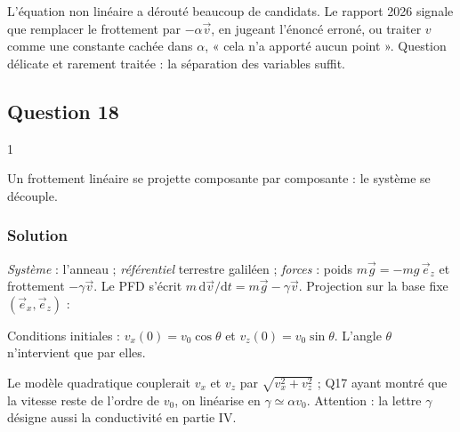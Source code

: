 \documentclass[11pt,a4paper]{article}
\newcommand{\equationajustee}[1]{%
  \sbox{\boiteequation}{$\displaystyle #1$}%
  \ifdim\wd\boiteequation>\linewidth
    \[\resizebox{\linewidth}{!}{\usebox{\boiteequation}}\]%
  \else
    \[#1\]%
  \fi}
\begin{document}
\begin{jury}

L'équation non linéaire a dérouté beaucoup de candidats. Le rapport 2026 signale que remplacer le frottement par \(-\alpha\vec v\), en jugeant l'énoncé erroné, ou traiter \(v\) comme une constante cachée dans \(\alpha\), « cela n'a apporté aucun point ». Question délicate et rarement traitée : la séparation des variables suffit.

\end{jury}

\hypertarget{question-18}{%
\subsection{Question 18}\label{question-18}}

\begin{indication}{1}

Un frottement linéaire se projette composante par composante : le système se découple.

\end{indication}

\hypertarget{solution-17}{%
\subsubsection{Solution}\label{solution-17}}

\emph{Système} : l'anneau ; \emph{référentiel} terrestre galiléen ; \emph{forces} : poids \(m\vec g=-mg\,\vec e_z\) et frottement \(-\gamma\vec v\). Le PFD s'écrit \(m\,\mathrm d\vec v/\mathrm dt=m\vec g-\gamma\vec v\). Projection sur la base fixe \((\vec e_x,\vec e_z)\) :

\equationajustee{\boxed{\frac{\mathrm dv_x}{\mathrm dt}=-\frac\gamma m\,v_x}}

\equationajustee{\boxed{\frac{\mathrm dv_z}{\mathrm dt}=-g-\frac\gamma m\,v_z}}

Conditions initiales : \(v_x(0)=v_0\cos\theta\) et \(v_z(0)=v_0\sin\theta\). L'angle \(\theta\) n'intervient que par elles.

\begin{methode}

Le modèle quadratique couplerait \(v_x\) et \(v_z\) par \(\sqrt{v_x^2+v_z^2}\) ; Q17 ayant montré que la vitesse reste de l'ordre de \(v_0\), on linéarise en \(\gamma\simeq\alpha v_0\). Attention : la lettre \(\gamma\) désigne aussi la conductivité en partie IV.

\end{methode}
\end{document}
